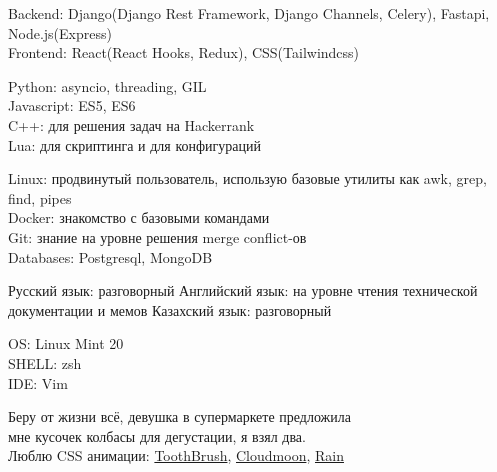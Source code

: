 \documentclass[10pt]{article} %
\begin{document}
{
  Backend: Django(Django Rest Framework, Django Channels, Celery), Fastapi, Node.js(Express)\\
  Frontend: React(React Hooks, Redux), CSS(Tailwindcss)
}

{
  Python: asyncio, threading, GIL\\
  Javascript: ES5, ES6\\
  C++: для решения задач на Hackerrank\\
  Lua: для скриптинга и для конфигураций
}

{
  Linux: продвинутый пользователь, использую базовые утилиты как awk, grep, find, pipes\\
  Docker: знакомство с базовыми командами\\
  Git: знание на уровне решения merge conflict-ов\\
  Databases: Postgresql, MongoDB
}

{
  Русский язык: разговорный
  Английский язык: на уровне чтения технической документации и мемов
  Казахский язык: разговорный
}


{
  OS: Linux Mint 20\\
  SHELL: zsh\\
  IDE: Vim
}

{
  Беру от жизни всё, девушка в супермаркете предложила \\ 
  мне кусочек колбасы для дегустации, я взял два. \\ 
  Люблю CSS анимации: \href{https://kuator.github.io/gh-pages/image-reveal-kinda}{ToothBrush},
    \href{https://kuator.github.io/gh-pages/cloudmoon}{Cloudmoon},
    \href{https://kuator.github.io/gh-pages/rain/}{Rain}
}
\end{document}
